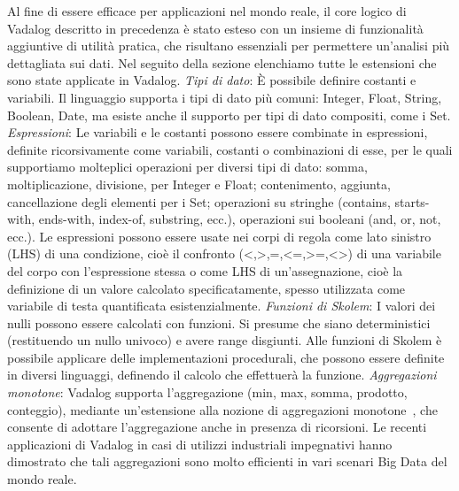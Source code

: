 Al fine di essere efficace per applicazioni nel mondo reale, il core logico di Vadalog descritto in precedenza è stato esteso con un insieme di funzionalità aggiuntive di utilità pratica, che risultano essenziali per permettere un'analisi più dettagliata sui dati. Nel seguito della sezione elenchiamo tutte le estensioni che sono state applicate in Vadalog. \newline \newline
\emph{Tipi di dato}: È possibile definire costanti e variabili. Il linguaggio supporta i tipi di dato più comuni: Integer, Float, String, Boolean, Date, ma esiste anche il supporto per tipi di dato compositi, come i Set. \newline \newline
\emph{Espressioni}: Le variabili e le costanti possono essere combinate in espressioni, definite ricorsivamente come variabili, costanti o combinazioni di esse, per le quali supportiamo molteplici operazioni per diversi tipi di dato: somma, moltiplicazione, divisione, per Integer e Float; contenimento, aggiunta, cancellazione degli elementi per i Set; operazioni su stringhe (contains, starts-with, ends-with, index-of, substring, ecc.), operazioni sui booleani (and, or, not, ecc.). \newline
Le espressioni possono essere usate nei corpi di regola come lato sinistro (LHS) di una condizione, cioè il confronto (<,>,=,<=,>=,<>) di una variabile del corpo con l'espressione stessa o come LHS di un'assegnazione, cioè la definizione di un valore calcolato specificatamente, spesso utilizzata come variabile di testa quantificata esistenzialmente. \newline \newline
\emph{Funzioni di Skolem}: I valori dei nulli possono essere calcolati con funzioni. Si presume che siano deterministici (restituendo un nullo univoco) e avere range disgiunti. Alle funzioni di Skolem è possibile applicare delle implementazioni procedurali, che possono essere definite in diversi linguaggi, definendo il calcolo che effettuerà la funzione. \newline \newline
\emph{Aggregazioni monotone}: Vadalog supporta l'aggregazione (min, max, somma, prodotto, conteggio), mediante un'estensione alla nozione di aggregazioni monotone~\cite{shkapsky2015optimizing}, che consente di adottare l'aggregazione anche in presenza di ricorsioni. Le recenti applicazioni di Vadalog in casi di utilizzi industriali impegnativi hanno dimostrato che tali aggregazioni sono molto efficienti in vari scenari Big Data del mondo reale. \newline \newline
